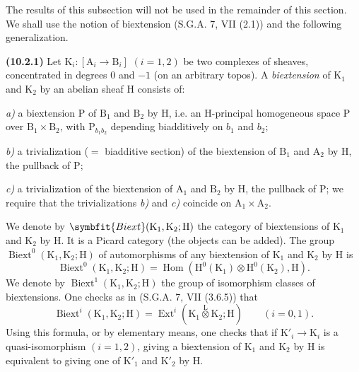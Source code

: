 \documentclass[11pt,leqno]{article}
\begin{document}
The results of this subsection will not be used in the remainder of this
section. We shall use the notion of biextension
(S.G.A. 7, VII (2.1)) and the following generalization.

\textbf{(10.2.1)} Let
\(\mathrm{K}_i:[\mathrm{A}_i\to\mathrm{B}_i]\) \((i=1,2)\)
be two complexes of sheaves, concentrated in degrees 0 and \(-1\)
(on an arbitrary topos). A \textit{biextension} of
\(\mathrm{K}_1\) and \(\mathrm{K}_2\) by an abelian sheaf
\(\mathrm{H}\) consists of:

\noindent \textit{a)} a biextension \(\mathrm{P}\) of
\(\mathrm{B}_1\) and \(\mathrm{B}_2\) by \(\mathrm{H}\), i.e. an
\(\mathrm{H}\)-principal homogeneous space \(\mathrm{P}\) over
\(\mathrm{B}_1\times\mathrm{B}_2\), with
\(\mathrm{P}_{b_1b_2}\) depending biadditively on \(b_1\) and \(b_2\);\par
\noindent \textit{b)} a trivialization (\(=\) biadditive section)
of the biextension of \(\mathrm{B}_1\) and \(\mathrm{A}_2\) by
\(\mathrm{H}\), the pullback of \(\mathrm{P}\);\par
\noindent \textit{c)} a trivialization of the biextension of
\(\mathrm{A}_1\) and \(\mathrm{B}_2\) by \(\mathrm{H}\), the
pullback of \(\mathrm{P}\); we require that the trivializations
\textit{b)} and \textit{c)} coincide on
\(\mathrm{A}_1\times\mathrm{A}_2\).

We denote by
\(\symbfit{Biext}(\mathrm{K}_1,\mathrm{K}_2;\mathrm{H})\)
the category of biextensions of \(\mathrm{K}_1\) and \(\mathrm{K}_2\)
by \(\mathrm{H}\). It is a Picard category (the objects can be
added). The group
\(\operatorname{Biext}^0(\mathrm{K}_1,\mathrm{K}_2;\mathrm{H})\)
of automorphisms of any biextension of \(\mathrm{K}_1\)
and \(\mathrm{K}_2\) by \(\mathrm{H}\) is
\[
\operatorname{Biext}^0(\mathrm{K}_1,\mathrm{K}_2;\mathrm{H})
=\operatorname{Hom}
(\mathrm{H}^0(\mathrm{K}_1)\otimes\mathrm{H}^0(\mathrm{K}_2),\mathrm{H}).
\]
We denote by
\(\operatorname{Biext}^1(\mathrm{K}_1,\mathrm{K}_2;\mathrm{H})\)
the group of isomorphism classes of biextensions. One checks as
in (S.G.A. 7, VII (3.6.5)) that
\[
\operatorname{Biext}^i(\mathrm{K}_1,\mathrm{K}_2;\mathrm{H})
=\operatorname{Ext}^i
(\mathrm{K}_1\overset{\mathrm{L}}{\otimes}\mathrm{K}_2;\mathrm{H})
\qquad(i=0,1).
\]
Using this formula, or by elementary means, one checks that if
\(\mathrm{K}'_i\to\mathrm{K}_i\) is a quasi-isomorphism
\((i=1,2)\), giving a biextension of
\(\mathrm{K}_1\) and \(\mathrm{K}_2\) by \(\mathrm{H}\) is equivalent to giving one of
\(\mathrm{K}'_1\) and \(\mathrm{K}'_2\) by \(\mathrm{H}\).
\end{document}
